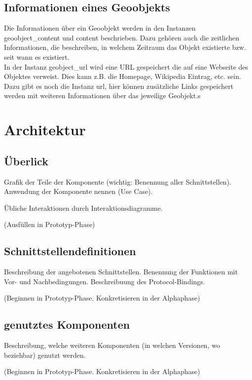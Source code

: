 \subsection{Informationen eines Geoobjekts}
Die Informationen über ein Geoobjekt werden in den Instanzen geoobject\_content und content beschrieben. Dazu gehören auch die zeitlichen Informationen, die beschreiben, in welchem Zeitraum das Objekt existierte bzw. seit wann es existiert.  \\
In der Instanz geobject\_url wird eine URL gespeichert die auf eine Webseite des Objektes verweist. Dies kann z.B. die Homepage, Wikipedia Eintrag, etc. sein. Dazu gibt es noch die Instanz url, hier können zusätzliche Links gespeichert werden mit weiteren Informationen über das jeweilige Geobjekt.s


\section{Architektur}

\subsection{Überlick}
Grafik der Teile der Komponente (wichtig: Benennung aller Schnittstellen). 
Anwendung der Komponente nennen (Use Case).

Übliche Interaktionen durch Interaktionsdiagramme.

(Ausfüllen in Prototyp-Phase)

\subsection{Schnittstellendefinitionen}
Beschreibung der angebotenen Schnittstellen. Benennung der Funktionen
mit Vor- und Nachbedingungen. Beschreibuung des Protocol-Bindings.

(Beginnen in Prototyp-Phase. Konkretisieren in der Alphaphase)

\subsection{genutztes Komponenten}
Beschreibung, welche weiteren Komponenten (in welchen Versionen, wo beziehbar) genutzt werden.

(Beginnen in Prototyp-Phase. Konkretisieren in der Alphaphase)

